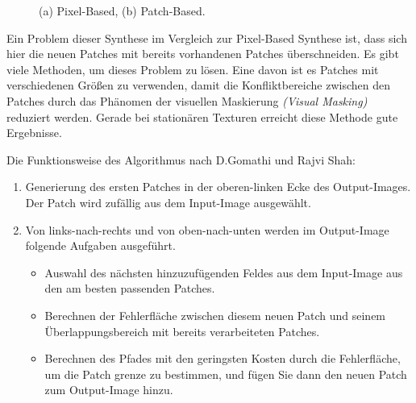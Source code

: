 \documentclass[12pt, a4paper,twoside,openright]{report} %
\begin{document}
\begin{figure}[H]
    \centering
    \qquad
    \caption{(a) Pixel-Based, (b) Patch-Based.}%
\end{figure}

Ein Problem dieser Synthese im Vergleich zur Pixel-Based Synthese ist, dass sich hier die neuen Patches mit bereits vorhandenen Patches überschneiden.
Es gibt viele Methoden, um dieses Problem zu lösen.
Eine davon ist es Patches mit verschiedenen Größen zu verwenden, damit die Konfliktbereiche zwischen den Patches durch das Phänomen der visuellen Maskierung
\textit{(Visual Masking)} reduziert werden.
Gerade bei stationären Texturen erreicht diese Methode gute Ergebnisse. \cite{EfrosQuilt}

Die Funktionsweise des Algorithmus nach D.Gomathi und Rajvi Shah:

\begin{enumerate}
    \item Generierung des ersten Patches in der oberen-linken Ecke des Output-Images. Der Patch wird zufällig aus dem Input-Image ausgewählt.
    \item Von links-nach-rechts und von oben-nach-unten werden im Output-Image folgende Aufgaben ausgeführt.
    \begin{itemize}
        \item Auswahl des nächsten hinzuzufügenden Feldes aus dem Input-Image aus den am besten passenden Patches.
        \item Berechnen der Fehlerfläche zwischen diesem neuen Patch und seinem Überlappungsbereich mit bereits
        verarbeiteten Patches.
        \item Berechnen des Pfades mit den geringsten Kosten durch die Fehlerfläche, um die Patch grenze zu bestimmen, und fügen Sie dann den neuen Patch zum Output-Image hinzu.
    \end{itemize}
\end{enumerate}
\end{document}
